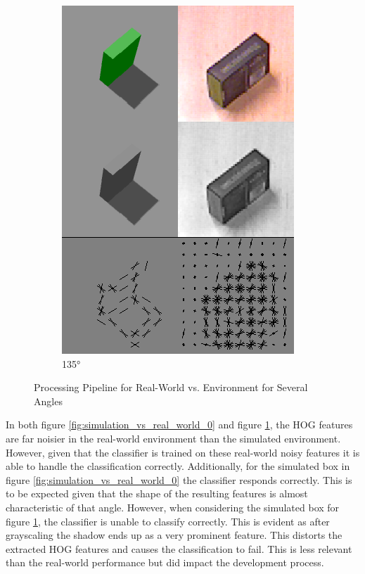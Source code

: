 \documentclass[letterpaper, 10 pt, conference]{conf/ieeeconf}  %
\begin{document}
\begin{figure}[H]
\begin{subfigure}[b]{0.238\textwidth}
    \includegraphics[width=\textwidth]{simulation_vs_real_world_broken.png}
    \caption{\label{fig:simulation_vs_real_world_135}\ang{135}}
  \end{subfigure}
  \caption{\label{fig:pipelines} Processing Pipeline for Real-World vs.
    Environment for Several Angles}
\end{figure}

In both figure \ref{fig:simulation_vs_real_world_0} and figure
\ref{fig:simulation_vs_real_world_135}, the HOG features are far noisier in the
real-world environment than the simulated environment. However, given that the
classifier is trained on these real-world noisy features it is able to handle
the classification correctly. Additionally, for the simulated box in figure
\ref{fig:simulation_vs_real_world_0} the classifier responds correctly. This is
to be expected given that the shape of the resulting features is almost
characteristic of that angle. However, when considering the simulated box for
figure \ref{fig:simulation_vs_real_world_135}, the classifier is unable to
classify correctly. This is evident as after grayscaling the shadow ends up as a
very prominent feature. This distorts the extracted HOG features and causes the
classification to fail. This is less relevant than the real-world performance
but did impact the development process.
\end{document}
